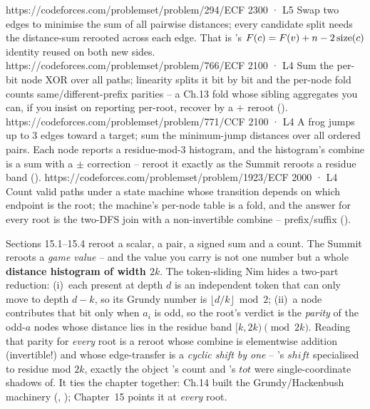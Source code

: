 \begin{mixedset}
    {https://codeforces.com/problemset/problem/294/E}{CF 2300 · L5}
    {Swap two edges to minimise the sum of all pairwise distances; every candidate split needs the distance-sum rerooted across each edge. That is 's $F(c)=F(v)+n-2\operatorname{size}(c)$ identity reused on both new sides.}
    {https://codeforces.com/problemset/problem/766/E}{CF 2100 · L4}
    {Sum the per-bit node XOR over all paths; linearity splits it bit by bit and the per-node fold counts same/different-prefix parities -- a Ch.13 fold whose sibling aggregates you can, if you insist on reporting per-root, recover by a $+$ reroot ().}
    {https://codeforces.com/problemset/problem/771/C}{CF 2100 · L4}
    {A frog jumps up to $3$ edges toward a target; sum the minimum-jump distances over all ordered pairs. Each node reports a residue-mod-$3$ histogram, and the histogram's combine is a sum with a $\pm$ correction -- reroot it exactly as the Summit reroots a residue band ().}
    {https://codeforces.com/problemset/problem/1923/E}{CF 2000 · L4}
    {Count valid paths under a state machine whose transition depends on which endpoint is the root; the machine's per-node table is a fold, and the answer for every root is the two-DFS join with a non-invertible combine -- prefix/suffix ().}
\end{mixedset}



\begin{notebox}
Sections 15.1--15.4 reroot a scalar, a pair, a signed sum and a count. The
Summit reroots a \emph{game value} -- and the value you carry is not one number
but a whole \textbf{distance histogram of width $2k$}. The token-sliding Nim hides
a two-part reduction: (i)~each present at depth $d$ is an independent token that
can only move to depth $d-k$, so its Grundy number is $\lfloor d/k\rfloor \bmod 2$;
(ii)~a node contributes that bit only when $a_i$ is odd, so the root's verdict is
the \emph{parity} of the odd-$a$ nodes whose distance lies in the residue band
$[k,2k) \pmod{2k}$. Reading that parity for \emph{every} root is a reroot whose
combine is elementwise addition (invertible!) and whose edge-transfer is a
\emph{cyclic shift by one} -- 's $\mathit{shift}$
specialised to residue mod $2k$, exactly the object 's
count and 's $\mathit{tot}$ were single-coordinate
shadows of. It ties the chapter together: Ch.14 built the Grundy/Hackenbush
machinery (, ); Chapter~15 points it
at \emph{every} root.
\end{notebox}

